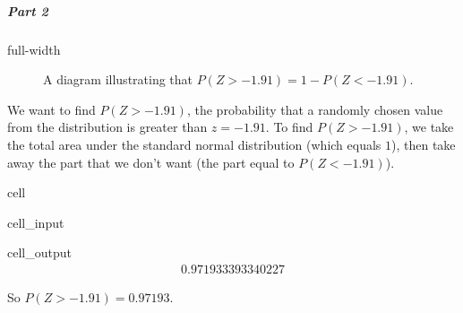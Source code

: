 \documentclass[letterpaper,10pt,english]{jupyterBook}
\begin{document}
\subparagraph{Part 2}
\label{\detokenize{Ch4 The Normal Distribution and the Central Limit Theorem/4.2 The Standard Normal Distribution:id4}}
\begin{sphinxuseclass}{full-width}
\begin{figure}[htbp]
\centering
\capstart

\noindent{}
\caption{A diagram illustrating that \(P(Z > -1.91) = 1 - P(Z < -1.91)\).}\label{\detokenize{Ch4 The Normal Distribution and the Central Limit Theorem/4.2 The Standard Normal Distribution:id10}}\end{figure}

\end{sphinxuseclass}
\sphinxAtStartPar
We want to find \(P(Z > -1.91)\), the probability that a randomly chosen value from the distribution is greater than \(z = -1.91\). To find \(P(Z > -1.91)\), we take the total area under the standard normal distribution (which equals \(1\)), then take away the part that we don’t want (the part equal to \(P(Z < -1.91)\)).

\begin{sphinxuseclass}{cell}\begin{sphinxVerbatimInput}

\begin{sphinxuseclass}{cell_input}
\begin{sphinxVerbatim}[commandchars=\\\{\}]
\end{sphinxVerbatim}

\end{sphinxuseclass}\end{sphinxVerbatimInput}
\begin{sphinxVerbatimOutput}

\begin{sphinxuseclass}{cell_output}\begin{equation*}
\begin{split}0.971933393340227\end{split}
\end{equation*}
\end{sphinxuseclass}\end{sphinxVerbatimOutput}

\end{sphinxuseclass}
\sphinxAtStartPar
So \(P(Z > -1.91) = 0.97193\).
\end{document}
